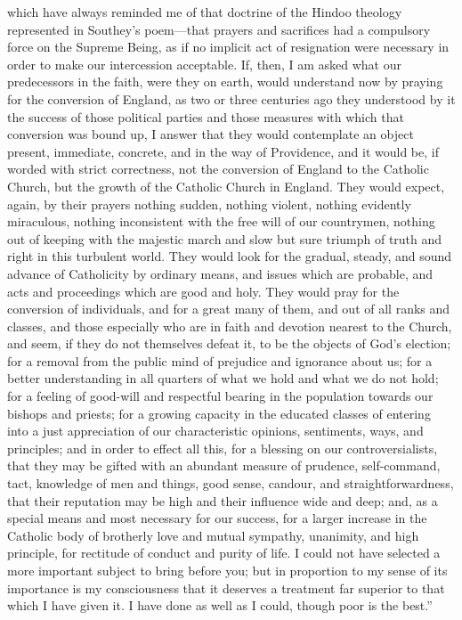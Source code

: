 which have always reminded me of that doctrine of the Hindoo theology
represented in Southey’s poem—that prayers and sacrifices had a
compulsory force on the Supreme Being, as if no implicit act of
resignation were necessary in order to make our intercession
acceptable. If, then, I am asked what our predecessors in the faith,
were they on earth, would understand now by praying for the conversion
of England, as two or three centuries ago they understood by it the
success of those political parties and those measures with which that
conversion was bound up, I answer that they would contemplate an
object present, immediate, concrete, and in the way of Providence, and
it would be, if worded with strict correctness, not the conversion of
England to the Catholic Church, but the growth of the Catholic Church
in England. They would expect, again, by their prayers nothing sudden,
nothing violent, nothing evidently miraculous, nothing inconsistent
with the free will of our countrymen, nothing out of keeping with the
majestic march and slow but sure triumph of truth and right in this
turbulent world. They would look for the gradual, steady, and sound
advance of Catholicity by ordinary means, and issues which are
probable, and acts and proceedings which are good and holy. They would
pray for the conversion of individuals, and for a great many of them,
and out of all ranks and classes, and those especially who are in
faith and devotion nearest to the Church, and seem, if they do not
themselves defeat it, to be the objects of God’s election; for a
removal from the public mind of prejudice and ignorance about us; for
a better understanding in all quarters of what we hold and what we do
not hold; for a feeling of good-will and respectful bearing in the
population towards our bishops and priests; for a growing capacity in
the educated classes of entering into a just appreciation of our
characteristic opinions, sentiments, ways, and principles; and in
order to effect all this, for a blessing on our controversialists,
that they may be gifted with an abundant measure of prudence,
self-command, tact, knowledge of men and things, good sense, candour,
and straightforwardness, that their reputation may be high and their
influence wide and deep; and, as a special means and most necessary
for our success, for a larger increase in the Catholic body of
brotherly love and mutual sympathy, unanimity, and high principle, for
rectitude of conduct and purity of life. I could not have
selected a more important subject to bring before you; but in
proportion to my sense of its importance is my consciousness that it
deserves a treatment far superior to that which I have given it. I
have done as well as I could, though poor is the best.''

